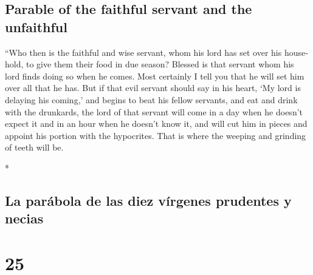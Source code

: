\begin{paracol}{2}
\begin{otherlanguage}{english}
\hypertarget{parable-of-the-faithful-servant-and-the-unfaithful}{%
\subsection{Parable of the faithful servant and the
unfaithful}\label{parable-of-the-faithful-servant-and-the-unfaithful}}

 ``Who then is the faithful and wise servant, whom his
lord has set over his household, to give them their food in due season?
 Blessed is that servant whom his lord finds doing so
when he comes.  Most certainly I tell you that he will
set him over all that he has.  But if that evil servant
should say in his heart, `My lord is delaying his coming,'
 and begins to beat his fellow servants, and eat and
drink with the drunkards,  the lord of that servant will
come in a day when he doesn't expect it and in an hour when he doesn't
know it,  and will cut him in pieces and appoint his
portion with the hypocrites. That is where the weeping and grinding of
teeth will be.

\end{otherlanguage}

\switchcolumn[0]*

\hypertarget{la-paruxe1bola-de-las-diez-vuxedrgenes-prudentes-y-necias}{%
\subsection{La parábola de las diez vírgenes prudentes y
necias}\label{la-paruxe1bola-de-las-diez-vuxedrgenes-prudentes-y-necias}}

\hypertarget{section-48}{%
\section{25}\label{section-48}}


\end{paracol}
